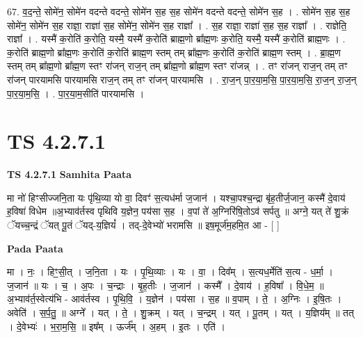 \documentclass[17pt]{extarticle}
\begin{document}
67. व॒द॒न्ते॒ सोमे॑न॒ सोमे॑न वदन्ते वदन्ते॒ सोमे॑न स॒ह स॒ह सोमे॑न वदन्ते वदन्ते॒ सोमे॑न स॒ह । . सोमे॑न स॒ह स॒ह सोमे॑न॒ सोमे॑न स॒ह राज्ञा॒ राज्ञा॑ स॒ह सोमे॑न॒ सोमे॑न स॒ह राज्ञा᳚ । . स॒ह राज्ञा॒ राज्ञा॑ स॒ह स॒ह राज्ञा᳚ । . राज्ञेति॒ राज्ञा᳚ । . यस्मै॑ क॒रोति॑ क॒रोति॒ यस्मै॒ यस्मै॑ क॒रोति॑ ब्राह्म॒णो ब्रा᳚ह्म॒णः क॒रोति॒ यस्मै॒ यस्मै॑ क॒रोति॑ ब्राह्म॒णः । . क॒रोति॑ ब्राह्म॒णो ब्रा᳚ह्म॒णः क॒रोति॑ क॒रोति॑ ब्राह्म॒ण स्तम् तम् ब्रा᳚ह्म॒णः क॒रोति॑ क॒रोति॑ ब्राह्म॒ण स्तम् । . ब्रा॒ह्म॒ण स्तम् तम् ब्रा᳚ह्म॒णो ब्रा᳚ह्म॒ण स्तꣳ रा॑जन् राज॒न् तम् ब्रा᳚ह्म॒णो ब्रा᳚ह्म॒ण स्तꣳ रा॑जन्न् । . तꣳ रा॑जन् राज॒न् तम् तꣳ रा॑जन् पारयामसि पारयामसि राज॒न् तम् तꣳ रा॑जन् पारयामसि । . रा॒ज॒न् पा॒र॒या॒म॒सि॒ पा॒र॒या॒म॒सि॒ रा॒ज॒न् रा॒ज॒न् पा॒र॒या॒म॒सि॒ । . पा॒र॒या॒म॒सीति॑ पारयामसि । \newline
\pagebreak
{}

\section{ TS 4.2.7.1 }

\textbf{TS 4.2.7.1 } \newline
\textbf{Samhita Paata} \newline

मा नो॑ हिꣳसीज्जनि॒ता यः पृ॑थि॒व्या यो वा॒ दिवꣳ॑ स॒त्यध॑र्मा ज॒जान॑ । यश्चा॒पश्च॒न्द्रा बृ॑ह॒तीर्ज॒जान॒ कस्मै॑ दे॒वाय॑ ह॒विषा॑ विधेम ॥अ॒भ्याव॑र्तस्व पृथिवि य॒ज्ञेन॒ पय॑सा स॒ह । व॒पां ते॑ अ॒ग्निरि॑षि॒तोऽव॑ सर्पतु ॥ अग्ने॒ यत् ते॑ शु॒क्रं ॅयच्च॒न्द्रं ॅयत् पू॒तं ॅयद्-य॒ज्ञियं᳚ । तद्-दे॒वेभ्यो॑ भरामसि ॥ इष॒मूर्ज॑म॒हमि॒त आ - [  ] \newline

\textbf{Pada Paata} \newline

मा । नः॒ । हिꣳ॒॒सी॒त् । ज॒नि॒ता । यः । पृ॒थि॒व्याः । यः । वा॒ । दिव᳚म् । स॒त्यध॒र्मेति॑ स॒त्य - ध॒र्मा॒ । ज॒जान॑ ॥ यः । च॒ । अ॒पः । च॒न्द्राः । बृ॒ह॒तीः । ज॒जान॑ । कस्मै᳚ । दे॒वाय॑ । ह॒विषा᳚ । वि॒धे॒म॒ ॥ अ॒भ्याव॑र्त॒स्वेत्य॑भि - आव॑र्तस्व । पृ॒थि॒वि॒ । य॒ज्ञेन॑ । पय॑सा । स॒ह ॥ व॒पाम् । ते॒ । अ॒ग्निः । इ॒षि॒तः । अवेति॑ । स॒र्प॒तु॒ ॥ अग्ने᳚ । यत् । ते॒ । शु॒क्रम् । यत् । च॒न्द्रम् । यत् । पू॒तम् । यत् । य॒ज्ञिय᳚म् ॥ तत् । दे॒वेभ्यः॑ । भ॒रा॒म॒सि॒ ॥ इष᳚म् । ऊर्ज᳚म् । अ॒हम् । इ॒तः । एति॑ ।  \newline
\end{document}
